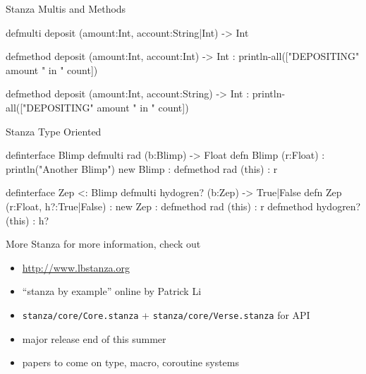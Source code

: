 \begin{frame}[fragile]{Stanza Multis and Methods}
\begin{scala}
defmulti deposit (amount:Int, account:String|Int) -> Int

defmethod deposit (amount:Int, account:Int) -> Int :
  println-all(["DEPOSITING" amount " in " count])

defmethod deposit (amount:Int, account:String) -> Int :
  println-all(["DEPOSITING" amount " in " count])
\end{scala}
\end{frame}

\begin{frame}[fragile]{Stanza Type Oriented}
\begin{stanza}
definterface Blimp
defmulti rad (b:Blimp) -> Float
defn Blimp (r:Float) :
  println("Another Blimp")
  new Blimp :
    defmethod rad (this) : r

definterface Zep <: Blimp
defmulti hydogren? (b:Zep) -> True|False
defn Zep (r:Float, h?:True|False) :
  new Zep :
    defmethod rad (this) : r
    defmethod hydogren? (this) : h?
\end{stanza}
\end{frame}

\begin{frame}[fragile]{More Stanza}
for more information, check out
\begin{itemize}
\item \url{http://www.lbstanza.org}
\item ``stanza by example'' online by Patrick Li
\item \verb+stanza/core/Core.stanza+ + \verb+stanza/core/Verse.stanza+ for API
\item major release end of this summer
\item papers to come on type, macro, coroutine systems
\end{itemize}
\end{frame}

